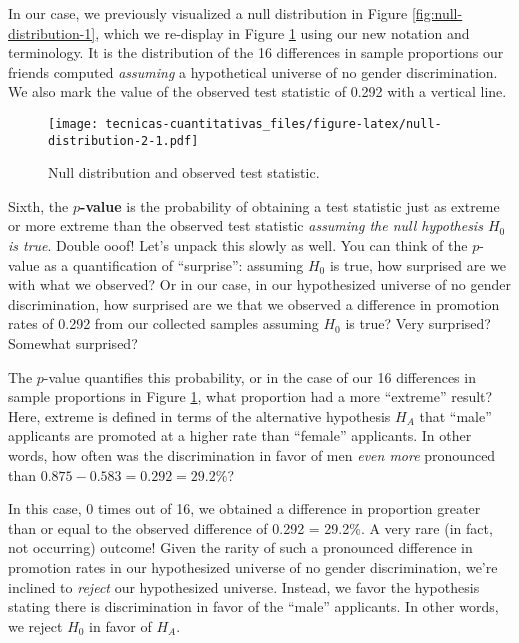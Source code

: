 \documentclass[
]{book}
\begin{document}
In our case, we previously visualized a null distribution in Figure \ref{fig:null-distribution-1}, which we re-display in Figure \ref{fig:null-distribution-2} using our new notation and terminology. It is the distribution of the 16 differences in sample proportions our friends computed \emph{assuming} a hypothetical universe of no gender discrimination. We also mark the value of the observed test statistic of 0.292 with a vertical line.

\begin{figure}
\centering
\texttt{[image: tecnicas-cuantitativas\_files/figure-latex/null-distribution-2-1.pdf]}
\caption{\label{fig:null-distribution-2}Null distribution and observed test statistic.}
\end{figure}

Sixth, the \textbf{\(p\)-value}  is the probability of obtaining a test statistic just as extreme or more extreme than the observed test statistic \emph{assuming the null hypothesis \(H_0\) is true}. Double ooof! Let's unpack this slowly as well. You can think of the \(p\)-value as a quantification of ``surprise'': assuming \(H_0\) is true, how surprised are we with what we observed? Or in our case, in our hypothesized universe of no gender discrimination, how surprised are we that we observed a difference in promotion rates of 0.292 from our collected samples assuming \(H_0\) is true? Very surprised? Somewhat surprised?

The \(p\)-value quantifies this probability, or in the case of our 16 differences in sample proportions in Figure \ref{fig:null-distribution-2}, what proportion had a more ``extreme'' result? Here, extreme is defined in terms of the alternative hypothesis \(H_A\) that ``male'' applicants are promoted at a higher rate than ``female'' applicants. In other words, how often was the discrimination in favor of men \emph{even more} pronounced than \(0.875 - 0.583 = 0.292 = 29.2\%\)?

In this case, 0 times out of 16, we obtained a difference in proportion greater than or equal to the observed difference of 0.292 = 29.2\%. A very rare (in fact, not occurring) outcome! Given the rarity of such a pronounced difference in promotion rates in our hypothesized universe of no gender discrimination, we're inclined to \emph{reject}  our hypothesized universe. Instead, we favor the hypothesis stating there is discrimination in favor of the ``male'' applicants. In other words, we reject \(H_0\) in favor of \(H_A\).
\end{document}
